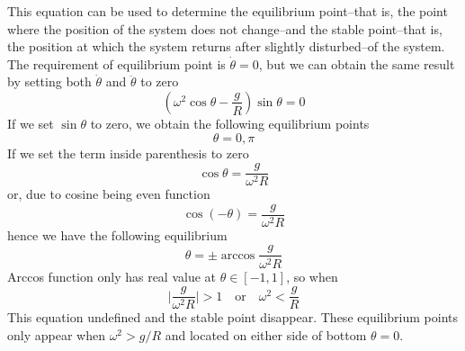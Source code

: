 \documentclass[../../../main.tex]{subfiles}
\begin{document}
This equation can be used to determine the equilibrium point--that is, the point where the position of the system does not change--and the stable point--that is, the position at which the system returns after slightly disturbed--of the system.
The requirement of equilibrium point is $\dot{\theta}=0$, but we can obtain the same result by setting both $\dot{\theta}$ and $\ddot{\theta}$ to zero 
\begin{equation*}
    \left(\omega^2\cos\theta-\frac{g}{R}\right)\sin\theta=0
\end{equation*}
If we set $\sin\theta$ to zero, we obtain the following equilibrium points
\begin{equation*}
    \theta=0,\pi
\end{equation*}
If we set the term inside parenthesis to zero 
\begin{equation*}
    \cos\theta=\frac{g}{\omega^2R}
\end{equation*}
or, due to cosine being even function
\begin{equation*}
    \cos\left(-\theta\right)=\frac{g}{\omega^2R}
\end{equation*}
hence we have the following equilibrium
\begin{equation*}
    \theta=\pm\arccos\frac{g}{\omega^2R}
\end{equation*}
Arccos function only has real value at $\theta\in [-1,1]$, so when 
\begin{equation*}
    \bigg|\frac{g}{\omega^2R}\bigg|>1\quad\text{or}\quad\omega^2<\frac{g}{R}
\end{equation*} 
This equation undefined and the stable point disappear. 
These equilibrium points only appear when $\omega^2>g/R$ and located on either side of bottom $\theta=0$.
\end{document}
